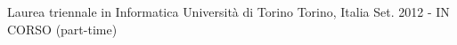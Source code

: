 


\begin{cventries}


\cventryy
{Laurea triennale in Informatica} %
{Università di Torino} %
{Torino, Italia} %
{Set. 2012 - IN CORSO (part-time)} %




\end{cventries}